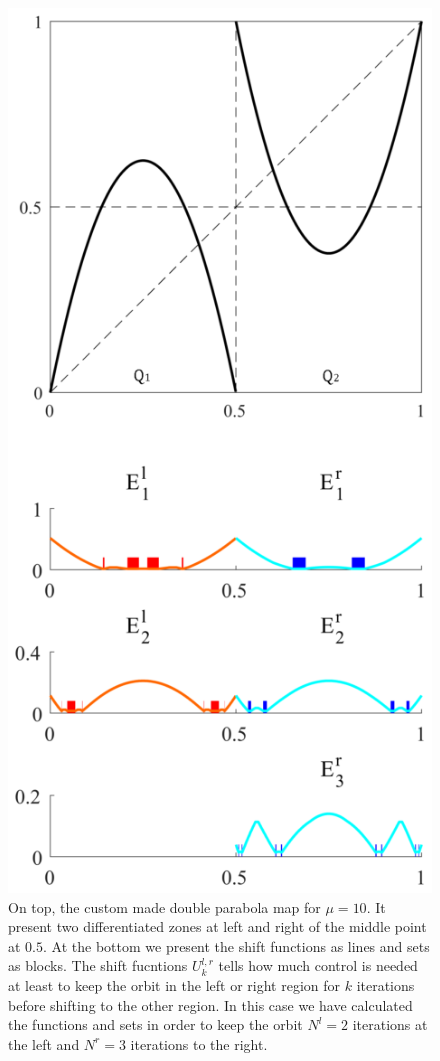 \begin{figure}
    \centering
    \includegraphics[width=0.4\textheight]{Images/P1/Alt_sets.eps}
    \caption{On top, the custom made double parabola map for $\mu = 10$. It present two differentiated zones at left and right of the middle point at $0.5$. At the bottom we present the shift functions as lines and sets as blocks. The shift fucntions $U^{l,r}_k$ tells how much control is needed at least to keep the orbit in the left or right region for $k$ iterations before shifting to the other region. In this case we have calculated the functions and sets in order to keep the orbit $N^l = 2$ iterations at the left and $N^r = 3$ iterations to the right.}
    \label{fig:ShiftSets}
\end{figure}



